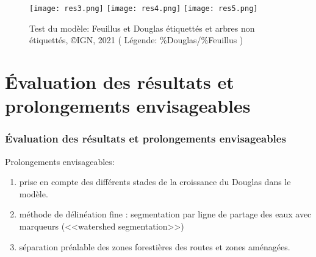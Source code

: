 \documentclass{beamer}
\begin{document}
\begin{frame}
	\begin{figure}
		\texttt{[image: res3.png]}
		\texttt{[image: res4.png]}
		\texttt{[image: res5.png]}
		\caption{Test du modèle: Feuillus et Douglas étiquettés et arbres non étiquettés, \copyright IGN, 2021 ( Légende: \%Douglas/\%Feuillus )}
	\end{figure}
\end{frame}

\section{\'{E}valuation des résultats et prolongements envisageables}

\begin{frame}


	\frametitle{\'{E}valuation des résultats et prolongements envisageables}
	Prolongements envisageables: 
	\begin{enumerate}
	\item prise en compte des différents stades de la croissance du Douglas dans le modèle.
	\item méthode de délinéation fine : segmentation par ligne de partage des eaux avec marqueurs (<<watershed segmentation>>)
	\item séparation préalable des zones forestières des routes et zones aménagées. 
	\end{enumerate}
\end{frame}
\end{document}
